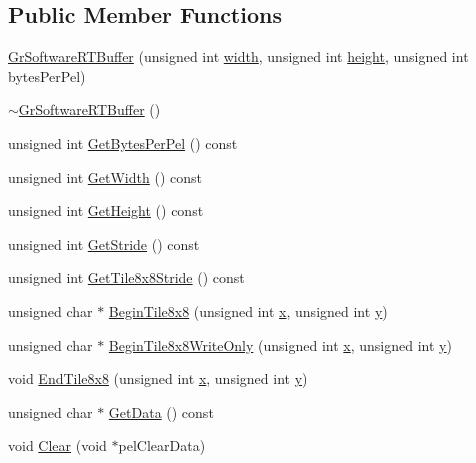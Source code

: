 \subsection*{Public Member Functions}
\begin{CompactItemize}
\item 
\hyperlink{class_gr_software_r_t_buffer_017c633b19fa649ce8ce609d6819819c}{GrSoftwareRTBuffer} (unsigned int \hyperlink{wglext_8h_e6531b1788ca42a9ae8155b0c52e7630}{width}, unsigned int \hyperlink{wglext_8h_b2e63df950c3789599e1e43f477bc9e3}{height}, unsigned int bytesPerPel)
\item 
\hyperlink{class_gr_software_r_t_buffer_90decbb3ae9cb6c99a3f078b77156311}{$\sim$GrSoftwareRTBuffer} ()
\item 
unsigned int \hyperlink{class_gr_software_r_t_buffer_7dd0b05522440e0b8112e974095ce0aa}{GetBytesPerPel} () const 
\item 
unsigned int \hyperlink{class_gr_software_r_t_buffer_c61ed73f4c054a6b3b6cf98e37741f87}{GetWidth} () const 
\item 
unsigned int \hyperlink{class_gr_software_r_t_buffer_72eb1f3acc53e88f3f89d79226c4e1f2}{GetHeight} () const 
\item 
unsigned int \hyperlink{class_gr_software_r_t_buffer_4b44fe3409b607a037b567ec19830257}{GetStride} () const 
\item 
unsigned int \hyperlink{class_gr_software_r_t_buffer_c0be8c165c3d4a9f110880704f6b2c42}{GetTile8x8Stride} () const 
\item 
unsigned char $\ast$ \hyperlink{class_gr_software_r_t_buffer_cd1d8af57e8676b94e5e1e5c21fbb4db}{BeginTile8x8} (unsigned int \hyperlink{wglext_8h_d77deca22f617d3f0e0eb786445689fc}{x}, unsigned int \hyperlink{wglext_8h_9298c7ad619074f5285b32c6b72bfdea}{y})
\item 
unsigned char $\ast$ \hyperlink{class_gr_software_r_t_buffer_f796e2b365ca4712537be3a927e565c6}{BeginTile8x8WriteOnly} (unsigned int \hyperlink{wglext_8h_d77deca22f617d3f0e0eb786445689fc}{x}, unsigned int \hyperlink{wglext_8h_9298c7ad619074f5285b32c6b72bfdea}{y})
\item 
void \hyperlink{class_gr_software_r_t_buffer_2e3662e5945e1f6df74f620f5b3b9b0f}{EndTile8x8} (unsigned int \hyperlink{wglext_8h_d77deca22f617d3f0e0eb786445689fc}{x}, unsigned int \hyperlink{wglext_8h_9298c7ad619074f5285b32c6b72bfdea}{y})
\item 
unsigned char $\ast$ \hyperlink{class_gr_software_r_t_buffer_04b103e0d51724ddf7320337a18e83f5}{GetData} () const 
\item 
void \hyperlink{class_gr_software_r_t_buffer_2e475a40722932bba43e7f2c4f7c2f20}{Clear} (void $\ast$pelClearData)
\end{CompactItemize}


